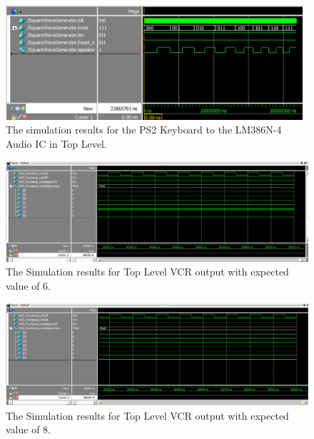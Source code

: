 \documentclass[a4paper]{article}
\begin{document}
\begin{figure}[h]
  \centering
    \includegraphics[width=0.98\textwidth]{sims/square_wave_generator/SquareWaveGenerator.png}
	\caption{The simulation results for the PS2 Keyboard to the LM386N-4 Audio IC in Top Level.}
    \label{fig:top-level-sim}
\end{figure}


\begin{figure}[t]
  \centering
  \includegraphics[width=.98\textwidth]{sims/vcr_testing/functionalUnitTest/FunctionalUnitTest_6.png}
  \caption{The Simulation results for Top Level VCR output with expected value of 6.}
  \label{fig:top-level-block-1}
\end{figure}

\begin{figure}[t]
  \centering
  \includegraphics[width=.98\textwidth]{sims/vcr_testing/functionalUnitTest/FunctionalUnitTest_8.png}
  \caption{The Simulation results for Top Level VCR output with expected value of 8.}
  \label{fig:top-level-block-1}
\end{figure}


\FloatBarrier
\end{document}
